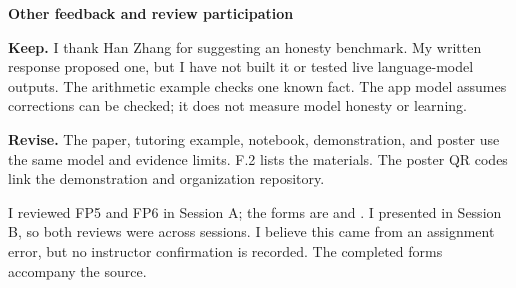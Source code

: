 \noindent\textbf{Other feedback and review participation}\par\nopagebreak[4]
\textbf{Keep.} I thank Han Zhang for suggesting an honesty benchmark. My written response proposed one, but I have not built it or tested live language-model outputs. The arithmetic example checks one known fact. The app model assumes corrections can be checked; it does not measure model honesty or learning.

\textbf{Revise.} The paper, tutoring example, notebook, demonstration, and poster use the same model and evidence limits. F.2 lists the materials. The poster QR codes link the demonstration and organization repository.

I reviewed FP5 and FP6 in Session A; the forms are  and . I presented in Session B, so both reviews were across sessions. I believe this came from an assignment error, but no instructor confirmation is recorded. The completed forms accompany the source.
\clearpage\onecolumn
